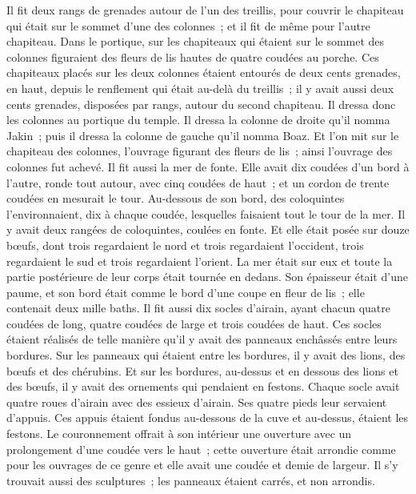 \begin{multicols}{2}
Il fit deux rangs de grenades autour de l'un des treillis, pour couvrir le chapiteau qui était sur le sommet d'une des colonnes~; et il fit de même pour l'autre chapiteau.
Dans le portique, sur les chapiteaux qui étaient sur le sommet des colonnes figuraient des fleurs de lis hautes de quatre coudées au porche.
Ces chapiteaux placés sur les deux colonnes étaient entourés de deux cents grenades, en haut, depuis le renflement qui était au-delà du treillis~; il y avait aussi deux cents grenades, disposées par rangs, autour du second chapiteau.
Il dressa donc les colonnes au portique du temple. Il dressa la colonne de droite qu'il nomma Jakin~; puis il dressa la colonne de gauche qu'il nomma Boaz.
Et l'on mit sur le chapiteau des colonnes, l'ouvrage figurant des fleurs de lis~; ainsi l'ouvrage des colonnes fut achevé.
Il fit aussi la mer de fonte. Elle avait dix coudées d'un bord à l'autre, ronde tout autour, avec cinq coudées de haut~; et un cordon de trente coudées en mesurait le tour.
Au-dessous de son bord, des coloquintes l'environnaient, dix à chaque coudée, lesquelles faisaient tout le tour de la mer. Il y avait deux rangées de coloquintes, coulées en fonte.
Et elle était posée sur douze bœufs, dont trois regardaient le nord et trois regardaient l'occident, trois regardaient le sud et trois regardaient l'orient. La mer était sur eux et toute la partie postérieure de leur corps était tournée en dedans.
Son épaisseur était d'une paume, et son bord était comme le bord d'une coupe en fleur de lis~; elle contenait deux mille baths.
Il fit aussi dix socles d'airain, ayant chacun quatre coudées de long, quatre coudées de large et trois coudées de haut.
Ces socles étaient réalisés de telle manière qu'il y avait des panneaux enchâssés entre leurs bordures.
Sur les panneaux qui étaient entre les bordures, il y avait des lions, des bœufs et des chérubins. Et sur les bordures, au-dessus et en dessous des lions et des bœufs, il y avait des ornements qui pendaient en festons.
Chaque socle avait quatre roues d'airain avec des essieux d'airain. Ses quatre pieds leur servaient d'appuis. Ces appuis étaient fondus au-dessous de la cuve et au-dessus, étaient les festons.
Le couronnement offrait à son intérieur une ouverture avec un prolongement d'une coudée vers le haut~; cette ouverture était arrondie comme pour les ouvrages de ce genre et elle avait une coudée et demie de largeur. Il s'y trouvait aussi des sculptures~; les panneaux étaient carrés, et non arrondis.

\end{multicols}
